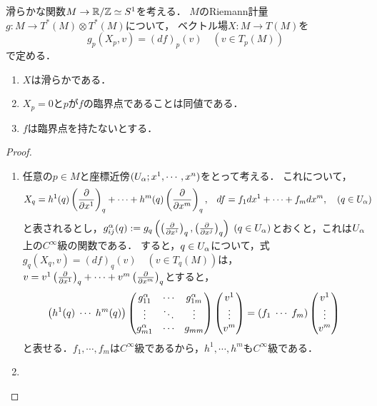 \documentclass[uplatex,dvipdfmx]{jsreport}
\begin{document}
\begin{problem}
    滑らかな関数$M\to\mathbb{R}/\mathbb{Z}\simeq S^1$を考える．
    $M$のRiemann計量$g:M\to T^*(M)\otimes T^*(M)$について，
    ベクトル場$X:M\to T(M)$を
    \[g_p(X_p,v)=(df)_p(v)\quad(v\in T_p(M))\]
    で定める．
    \begin{enumerate}
        \item $X$は滑らかである．
        \item $X_p=0$と$p$が$f$の臨界点であることは同値である．
        \item $f$は臨界点を持たないとする．
    \end{enumerate}
\end{problem}
\begin{proof}\mbox{}
    \begin{enumerate}
        \item 任意の$p\in M$と座標近傍$(U_\alpha;x^1,\cdots,x^n)$をとって考える．
        これについて，
        \begin{align*}
            X_q&=h^1(q)\left(\frac{\partial }{\partial x^1}\right)_q+\cdots+h^m(q)\left(\frac{\partial }{\partial x^m}\right)_q,&
            df&=f_1dx^1+\cdots+f_mdx^m,\quad(q\in U_\alpha)
        \end{align*}
        と表されるとし，$g_{ij}^\alpha(q):=g_q\left(\left(\frac{\partial }{\partial x^i}\right)_q,\left(\frac{\partial }{\partial x^j}\right)_q\right)\;(q\in U_\alpha)$とおくと，これは$U_\alpha$上の$C^\infty$級の関数である．
        すると，$q\in U_\alpha$について，式$g_q(X_q,v)=(df)_q(v)\quad(v\in T_q(M))$は，$v=v^1\left(\frac{\partial }{\partial x^1}\right)_q+\cdots+v^m\left(\frac{\partial }{\partial x^m}\right)_q$とすると，
        \begin{align*}
            \left(h^1(q)\;\cdots\;h^m(q)\right)\begin{pmatrix}g^\alpha_{11}&\cdots&g^\alpha_{1m}\\\vdots&\ddots&\vdots\\g^\alpha_{m1}&\cdots&g_{mm}\end{pmatrix}\begin{pmatrix}v^1\\\vdots\\v^m\end{pmatrix}=(f_1\;\cdots\;f_m)\begin{pmatrix}v^1\\\vdots\\v^m\end{pmatrix}
        \end{align*}
        と表せる．$f_1,\cdots,f_m$は$C^\infty$級であるから，$h^1,\cdots,h^m$も$C^\infty$級である．
        \item 

    \end{enumerate}
\end{proof}
\end{document}
